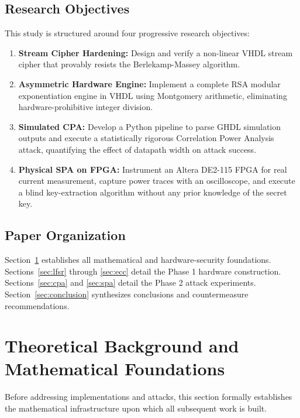\documentclass[conference, a4paper]{IEEEtran}
\begin{document}
\subsection{Research Objectives}
This study is structured around four progressive research objectives:
\begin{enumerate}[leftmargin=*, label=\textbf{O\arabic*.}]
    \item \textbf{Stream Cipher Hardening:} Design and verify a non-linear VHDL stream cipher that provably resists the Berlekamp-Massey algorithm.
    \item \textbf{Asymmetric Hardware Engine:} Implement a complete RSA modular exponentiation engine in VHDL using Montgomery arithmetic, eliminating hardware-prohibitive integer division.
    \item \textbf{Simulated CPA:} Develop a Python pipeline to parse GHDL simulation outputs and execute a statistically rigorous Correlation Power Analysis attack, quantifying the effect of datapath width on attack success.
    \item \textbf{Physical SPA on FPGA:} Instrument an Altera DE2-115 FPGA for real current measurement, capture power traces with an oscilloscope, and execute a blind key-extraction algorithm without any prior knowledge of the secret key.
\end{enumerate}

\subsection{Paper Organization}
Section~\ref{sec:theory} establishes all mathematical and hardware-security foundations. Sections~\ref{sec:lfsr} through \ref{sec:ecc} detail the Phase 1 hardware construction. Sections~\ref{sec:cpa} and \ref{sec:spa} detail the Phase 2 attack experiments. Section~\ref{sec:conclusion} synthesizes conclusions and countermeasure recommendations.

\section{Theoretical Background and Mathematical Foundations}
\label{sec:theory}

Before addressing implementations and attacks, this section formally establishes the mathematical infrastructure upon which all subsequent work is built.
\end{document}
